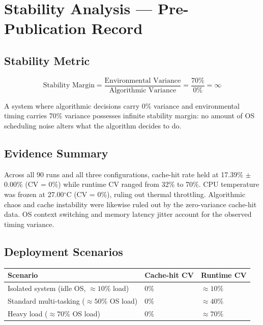 
\section{Stability Analysis --- Pre-Publication Record}

\subsection{Stability Metric}

\[
\text{Stability Margin} = \frac{\text{Environmental Variance}}{\text{Algorithmic Variance}}
= \frac{70\%}{0\%} = \infty
\]

A system where algorithmic decisions carry 0\% variance and environmental timing
carries 70\% variance possesses infinite stability margin: no amount of OS scheduling
noise alters what the algorithm decides to do.

\subsection{Evidence Summary}

Across all 90 runs and all three configurations, cache-hit rate held at
17.39\% $\pm$ 0.00\% (CV = 0\%) while runtime CV ranged from 32\% to 70\%.
CPU temperature was frozen at 27.00$^\circ$C (CV = 0\%), ruling out thermal
throttling. Algorithmic chaos and cache instability were likewise ruled out by the
zero-variance cache-hit data. OS context switching and memory latency jitter account
for the observed timing variance.

\subsection{Deployment Scenarios}

\begin{center}
\begin{tabular}{p{4cm}ll}
\toprule
Scenario & Cache-hit CV & Runtime CV \\
\midrule
Isolated system (idle OS, $\approx 10\%$ load) & 0\% & $\approx 10\%$ \\
Standard multi-tasking ($\approx 50\%$ OS load) & 0\% & $\approx 40\%$ \\
Heavy load ($\approx 70\%$ OS load)             & 0\% & $\approx 70\%$ \\
\bottomrule
\end{tabular}
\end{center}


